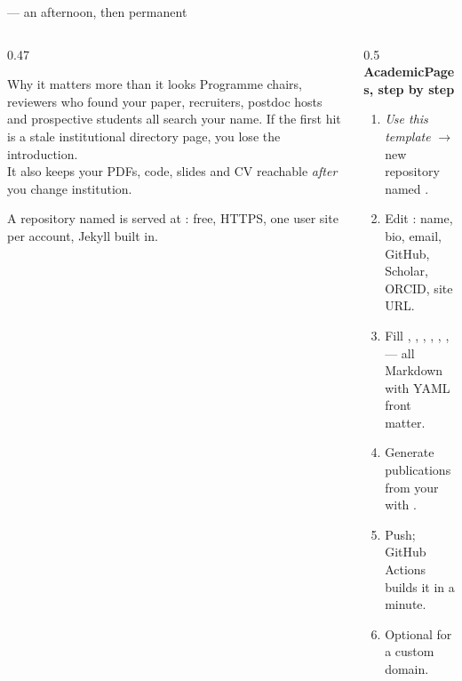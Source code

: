 \documentclass[aspectratio=169,11pt]{beamer}
\begin{document}
\begin{frame}{ --- an afternoon, then permanent}
\begin{columns}[T]
\begin{column}{0.47\textwidth}
\begin{block}{Why it matters more than it looks}
\footnotesize
Programme chairs, reviewers who found your paper, recruiters, postdoc hosts
and prospective students all search your name. If the first hit is a stale
institutional directory page, you lose the introduction.\\[3pt]
It also keeps your PDFs, code, slides and CV reachable \emph{after} you change
institution.
\end{block}
\footnotesize
A repository named   is served at
: free, HTTPS, one user site per account,
Jekyll built in.
\end{column}
\begin{column}{0.5\textwidth}
\textbf{AcademicPages, step by step}
\footnotesize
\begin{enumerate}
  \item \emph{Use this template} $\rightarrow$ new repository named
        .
  \item Edit : name, bio, email, GitHub, Scholar, ORCID,
        site URL.
  \item Fill , , ,
        , , ,  ---
        all Markdown with YAML front matter.
  \item Generate publications from your  with
        .
  \item Push; GitHub Actions builds it in a minute.
  \item Optional  for a custom domain.
\end{enumerate}
\end{column}
\end{columns}
\end{frame}
\end{document}
